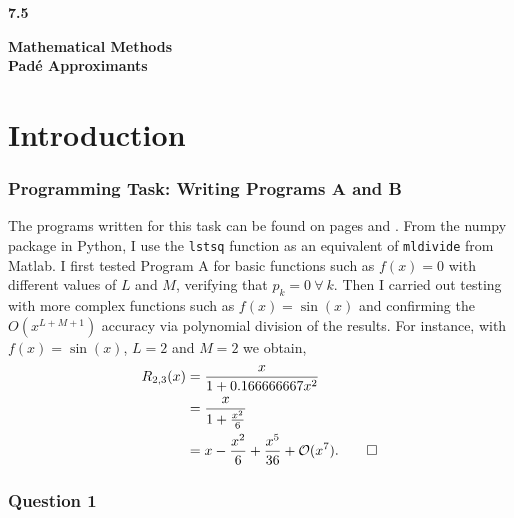 \documentclass[12pt, a4paper]{article}
\begin{document}
	
	\setlength{\parindent}{0pt}
	\captionsetup{justification=centering}
	\lstset{
		showstringspaces=false	
	}
	
	
	\begin{titlepage}
		\LARGE
		\textbf{7.5}
		\begin{center}
			\vspace*{7cm}
			
			\LARGE
			\textbf{Mathematical Methods}
			\\
			\vspace{1cm}
			\textbf{Pad\'e Approximants}
			
			\vspace{0.5cm}
		\end{center}
	\end{titlepage}

\section{Introduction}	
	
\subsubsection*{Programming Task: Writing Programs A and B}

The programs written for this task can be found on pages \pageref{Program_A} and
\pageref{Program_B}. From the numpy package in Python, I use the \texttt{lstsq} function
as an equivalent of \texttt{mldivide} from Matlab. I first tested Program A for basic
functions such as $f(x) = 0$ with different values of $L$ and $M$, verifying that
$p_{k} = 0 ~ \forall ~ k$. Then I carried out testing
with more complex functions such as $f(x) = \sin(x)$ and confirming the $O(x^{L+M+1})$
accuracy via polynomial division of the results. For instance, with
$f(x) = \sin(x)$, $L = 2$ and $M = 2$ we obtain,
\begin{align*}
	R_{2,3}(x) & = \frac{x}{1+0.166666667x^{2}}\\ 
	& = \frac{x}{1+\frac{x^{2}}{6}} \\
	& = x - \frac{x^{2}}{6} + \frac{x^{5}}{36}+\mathcal{O}(x^{7}). \qed
\end{align*}



\subsubsection*{Question 1}
\end{document}
